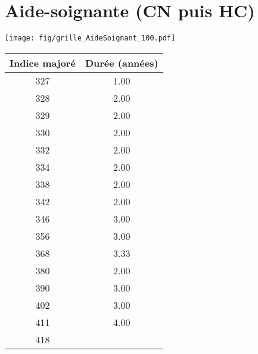 \newpage 
 
\chapter{Aide-soignante (CN puis HC)} 

\begin{minipage}{0.55\linewidth}\texttt{[image: fig/grille\_AideSoignant\_100.pdf]}\end{minipage} 
\begin{minipage}{0.3\linewidth} 
 \begin{center} 

\begin{tabular}[htb]{|c|c|} 
\hline 
 Indice majoré &  Durée (années) \\ 
\hline \hline 
 327 &  1.00 \\ 
\hline 
 328 &  2.00 \\ 
\hline 
 329 &  2.00 \\ 
\hline 
 330 &  2.00 \\ 
\hline 
 332 &  2.00 \\ 
\hline 
 334 &  2.00 \\ 
\hline 
 338 &  2.00 \\ 
\hline 
 342 &  2.00 \\ 
\hline 
 346 &  3.00 \\ 
\hline 
 356 &  3.00 \\ 
\hline 
 368 &  3.33 \\ 
\hline 
 380 &  2.00 \\ 
\hline 
 390 &  3.00 \\ 
\hline 
 402 &  3.00 \\ 
\hline 
 411 &  4.00 \\ 
\hline 
 418 &   \\ 
\hline 
\hline 
\end{tabular} 
\end{center} 
 \end{minipage} 

~\\ 
 


   
 \localtableofcontents 

